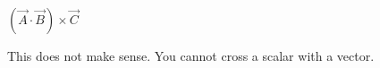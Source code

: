 $\left(\overrightarrow{A} \cdot \overrightarrow{B}\right) \times \overrightarrow{C}$

\begin{solution}
    This does not make sense. You cannot cross a scalar with a vector.
\end{solution}